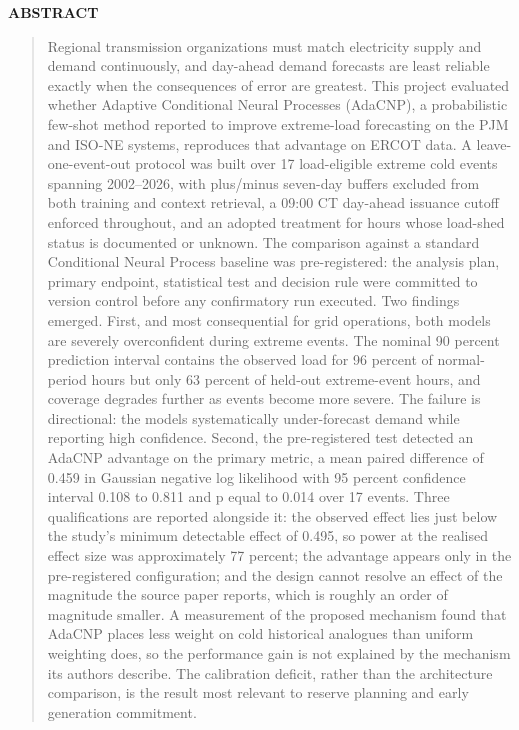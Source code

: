 \documentclass[12pt]{article} %
\begin{document}
\begin{center}
    \textbf{ABSTRACT}
\end{center}
\begin{quote}
Regional transmission organizations must match electricity supply and demand
continuously, and day-ahead demand forecasts are least reliable exactly when the
consequences of error are greatest. This project evaluated whether Adaptive
Conditional Neural Processes (AdaCNP), a probabilistic few-shot method reported
to improve extreme-load forecasting on the PJM and ISO-NE systems, reproduces
that advantage on ERCOT data. A leave-one-event-out protocol was built over 17
load-eligible extreme cold events spanning 2002--2026, with plus/minus seven-day
buffers excluded from both training and context retrieval, a 09:00 CT day-ahead
issuance cutoff enforced throughout, and an adopted treatment for hours whose
load-shed status is documented or unknown. The comparison against a standard
Conditional Neural Process baseline was pre-registered: the analysis plan,
primary endpoint, statistical test and decision rule were committed to version
control before any confirmatory run executed. Two findings emerged. First, and
most consequential for grid operations, both models are severely overconfident
during extreme events. The nominal 90 percent prediction interval contains the
observed load for 96 percent of normal-period hours but only 63 percent of
held-out extreme-event hours, and coverage degrades further as events become more
severe. The failure is directional: the models systematically under-forecast
demand while reporting high confidence. Second, the pre-registered test detected
an AdaCNP advantage on the primary metric, a mean paired difference of 0.459 in
Gaussian negative log likelihood with 95 percent confidence interval 0.108 to
0.811 and p equal to 0.014 over 17 events. Three qualifications are reported
alongside it: the observed effect lies just below the study's minimum detectable
effect of 0.495, so power at the realised effect size was approximately 77
percent; the advantage appears only in the pre-registered configuration; and the
design cannot resolve an effect of the magnitude the source paper reports, which
is roughly an order of magnitude smaller. A measurement of the proposed mechanism
found that AdaCNP places less weight on cold historical analogues than uniform
weighting does, so the performance gain is not explained by the mechanism its
authors describe. The calibration deficit, rather than the architecture
comparison, is the result most relevant to reserve planning and early generation
commitment.
\end{quote}
\end{document}
